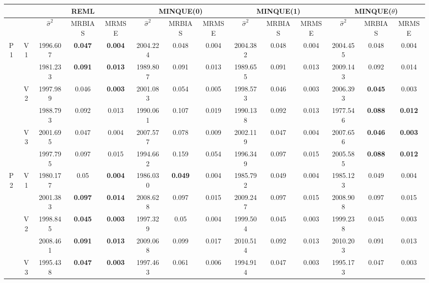 \documentclass[12pt,a4paper]{article}
\begin{document}
\begin{sidewaystable}[ht]
\centering
{\footnotesize
\begin{tabular}{cc|ccc|ccc|ccc|ccc|}
   & & \multicolumn{3}{c|}{REML}&\multicolumn{3}{c|}{MINQUE(0)}&\multicolumn{3}{c|}{MINQUE(1)}&\multicolumn{3}{c|}{MINQUE($\theta$)}\\ \hline
 &  & $\hat{\sigma}^2$ & MRBIAS & MRMSE & $\hat{\sigma}^2$ & MRBIAS & MRMSE & $\hat{\sigma}^2$ & MRBIAS & MRMSE & $\hat{\sigma}^2$ & MRBIAS & MRMSE \\ 
  \hline
\multirow{6}{*}{P1} & \multirow{2}{*}{V1} & 1996.607 & \textbf{0.047} & \textbf{0.004} & 2004.224 & 0.048 & 0.004 & 2004.382 & 0.048 & 0.004 & 2004.455 & 0.048 & 0.004 \\ 
   &  & 1981.233 & \textbf{0.091} & \textbf{0.013} & 1989.807 & 0.091 & 0.013 & 1989.655 & 0.091 & 0.013 & 2009.143 & 0.092 & 0.014 \\ 
   & \multirow{2}{*}{V2} & 1997.989 & 0.046 & \textbf{0.003} & 2001.083 & 0.054 & 0.005 & 1998.573 & 0.046 & 0.003 & 2006.393 & \textbf{0.045} & 0.003 \\ 
   &  & 1988.793 & 0.092 & 0.013 & 1990.061 & 0.107 & 0.019 & 1990.138 & 0.092 & 0.013 & 1977.546 & \textbf{0.088} & \textbf{0.012} \\ 
   & \multirow{2}{*}{V3} & 2001.695 & 0.047 & 0.004 & 2007.577 & 0.078 & 0.009 & 2002.119 & 0.047 & 0.004 & 2007.656 & \textbf{0.046} & \textbf{0.003} \\ 
   &  & 1997.795 & 0.097 & 0.015 & 1994.662 & 0.159 & 0.054 & 1996.349 & 0.097 & 0.015 & 2005.585 & \textbf{0.088} & \textbf{0.012} \\ 
   \hline \hline\multirow{6}{*}{P2} & \multirow{2}{*}{V1} & 1980.177 & 0.05 & \textbf{0.004} & 1986.030 & \textbf{0.049} & 0.004 & 1985.792 & 0.049 & 0.004 & 1985.123 & 0.049 & 0.004 \\ 
   &  & 2001.383 & \textbf{0.097} & \textbf{0.014} & 2008.628 & 0.097 & 0.015 & 2009.247 & 0.097 & 0.015 & 2008.908 & 0.097 & 0.015 \\ 
   & \multirow{2}{*}{V2} & 1998.845 & \textbf{0.045} & \textbf{0.003} & 1997.329 & 0.05 & 0.004 & 1999.504 & 0.045 & 0.003 & 1999.238 & 0.045 & 0.003 \\ 
   &  & 2008.461 & \textbf{0.091} & \textbf{0.013} & 2009.068 & 0.099 & 0.017 & 2010.514 & 0.092 & 0.013 & 2010.203 & 0.091 & 0.013 \\ 
   & \multirow{2}{*}{V3} & 1995.438 & \textbf{0.047} & \textbf{0.003} & 1997.463 & 0.061 & 0.006 & 1994.914 & 0.047 & 0.003 & 1995.173 & 0.047 & 0.003 \\ 

\end{tabular}}
\end{sidewaystable}
\end{document}
